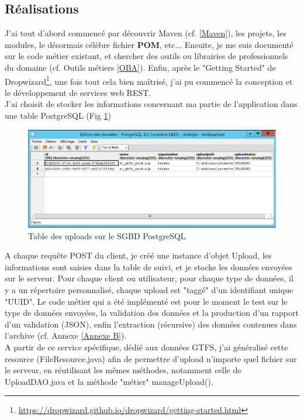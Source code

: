 \begin{itemize}
\subsection{Réalisations}

J'ai tout d'abord commencé par découvrir Maven (cf. \ref{Maven}), les projets, les modules, le désormais célèbre fichier \textbf{POM}, etc...
Ensuite, je me suis documenté sur le code métier existant, et chercher des outils ou librairies de professionnels du domaine (cf. Outils métiers \ref{OBA}).
Enfin, après le "Getting Started" de Dropwizard\footnote{\url{https://dropwizard.github.io/dropwizard/getting-started.html}}, une fois tout cela bien maîtrisé, j'ai pu commencé la conception et le développement de services web REST.\\

J'ai choisit de stocker les informations concernant ma partie de l'application dans une table PostgreSQL (Fig \ref{TablePostgres})\\
\begin{figure}[!h]
\centering
\includegraphics[width=14cm]{images/tablePostgres_mobiupload_small.png}
\caption{\label{TablePostgres}Table des uploads sur le SGBD PostgreSQL}
\end{figure} 

A chaque requête POST du client, je créé une instance d'objet Upload, les informations sont saisies dans la table de suivi, et je stocke les données envoyées sur le serveur. Pour chaque client ou utilisateur, pour chaque type de données, il y a un répertoire personnalisé, chaque upload est "taggé" d'un identifiant unique "UUID".
Le code métier qui a été implémenté est pour le moment le test sur le type de données envoyées, la validation des données et la production d'un rapport d'un validation (JSON), enfin l'extraction (récursive) des données contenues dans l'archive (cf. Annexe \ref{Annexe B}).\\

A partir de ce service spécifique, dédié aux données GTFS, j'ai généralisé cette resource (FileResource.java) afin de permettre d'upload n'importe quel fichier sur le serveur, en réutilisant les mêmes méthodes, notamment celle de UploadDAO.java et la méthode "métier" manageUpload().\\


\end{itemize}
